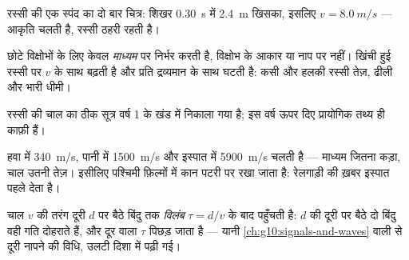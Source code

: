 \begin{omfigure}

{\small रस्सी की एक स्पंद का दो बार चित्र: शिखर \qty{0.30}{s} में \qty{2.4}{m} खिसका,
इसलिए $v = \qty{8.0}{m/s}$ --- आकृति चलती है, रस्सी ठहरी रहती है।}
\end{omfigure}

\begin{proposition}[चाल माध्यम तय करता है]\label{prop:g12:mechanical-waves:medium}
छोटे विक्षोभों के लिए  केवल \emph{माध्यम} पर निर्भर करती
है, विक्षोभ के आकार या नाप पर नहीं। खिंची हुई रस्सी पर $v$ 
के साथ बढ़ती है और प्रति  द्रव्यमान के साथ घटती है: कसी और हलकी
रस्सी तेज़, ढीली और भारी धीमी। \admitted
\end{proposition}

\begin{remark}[सूत्र कहाँ रहता है]\label{rem:g12:mechanical-waves:ropeformula}
रस्सी की चाल का ठीक सूत्र वर्ष 1 के खंड में निकाला गया है; इस वर्ष ऊपर दिए
प्रायोगिक तथ्य ही काफ़ी हैं।
\end{remark}

\begin{example}[ध्वनि की चालें]\label{ex:g12:mechanical-waves:speeds}
 हवा में \qty{340}{m/s}, पानी में \qty{1500}{m/s} और इस्पात में \qty{5900}{m/s} चलती है
--- माध्यम जितना कड़ा, चाल उतनी तेज़। इसीलिए पश्चिमी फ़िल्मों में कान पटरी पर
रखा जाता है: रेलगाड़ी की ख़बर इस्पात पहले देता है।
\end{example}

\begin{definition}[विलंब]\label{def:g12:mechanical-waves:delay}
चाल $v$ की तरंग दूरी $d$ पर बैठे बिंदु तक \emph{विलंब}
$\tau = d/v$ के बाद पहुँचती है: $d$ की दूरी पर बैठे दो बिंदु वही गति दोहराते
हैं, और दूर वाला $\tau$ पिछड़ जाता है --- यानी \cref{ch:g10:signals-and-waves} वाली 
से दूरी नापने की विधि, उलटी दिशा में पढ़ी गई।
\end{definition}

